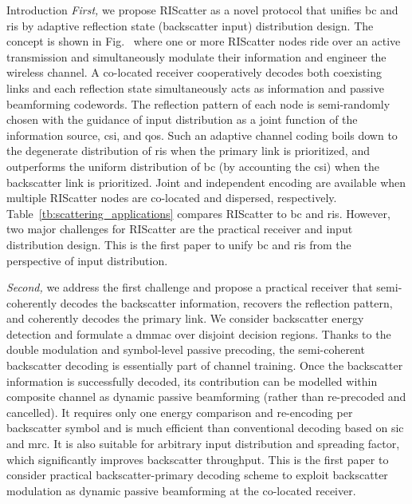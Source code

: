 \documentclass[journal]{IEEEtran}
\begin{document}
\begin{section}{Introduction}
	\emph{First,} we propose RIScatter as a novel protocol that unifies \gls{bc} and \gls{ris} by adaptive reflection state (backscatter input) distribution design.
	The concept is shown in Fig.~ where one or more RIScatter nodes ride over an active transmission and simultaneously modulate their information and engineer the wireless channel.
	A co-located receiver cooperatively decodes both coexisting links and each reflection state simultaneously acts as information and passive beamforming codewords.
	The reflection pattern of each node is semi-randomly chosen with the guidance of input distribution as a joint function of the information source, \gls{csi}, and \gls{qos}.
	Such an adaptive channel coding boils down to the degenerate distribution of \gls{ris} when the primary link is prioritized, and outperforms the uniform distribution of \gls{bc} (by accounting the \gls{csi}) when the backscatter link is prioritized.
	Joint and independent encoding are available when multiple RIScatter nodes are co-located and dispersed, respectively.
	Table~\ref{tb:scattering_applications} compares RIScatter to \gls{bc} and \gls{ris}.
	However, two major challenges for RIScatter are the practical receiver and input distribution design.
	This is the first paper to unify \gls{bc} and \gls{ris} from the perspective of input distribution.

	\emph{Second,} we address the first challenge and propose a practical receiver that semi-coherently decodes the backscatter information, recovers the reflection pattern, and coherently decodes the primary link.
	We consider backscatter energy detection and formulate a \gls{dmmac} over disjoint decision regions.
	Thanks to the double modulation and symbol-level passive precoding, the semi-coherent backscatter decoding is essentially part of channel training.
	Once the backscatter information is successfully decoded, its contribution can be modelled within composite channel as dynamic passive beamforming (rather than re-precoded and cancelled).
	It requires only one energy comparison and re-encoding per backscatter symbol and is much efficient than conventional decoding based on \gls{sic} and \gls{mrc}.
	It is also suitable for arbitrary input distribution and spreading factor, which significantly improves backscatter throughput.
	This is the first paper to consider practical backscatter-primary decoding scheme to exploit backscatter modulation as dynamic passive beamforming at the co-located receiver.


\end{section}
\end{document}
